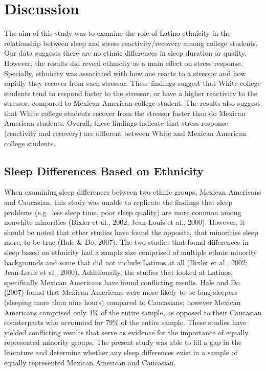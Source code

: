 \documentclass[man, fleqn, noextraspace]{apa6}
\begin{document}
\hypertarget{discussion}{%
\section{Discussion}\label{discussion}}

The aim of this study was to examine the role of Latino ethnicity in the relationship between sleep and stress reactivity/recovery among college students. Our data suggests there are no ethnic differences in sleep duration or quality. However, the results did reveal ethnicity as a main effect on stress response. Specially, ethnicity was associated with how one reacts to a stressor and how rapidly they recover from such stressor. These findings suggest that White college students tend to respond faster to the stressor, or have a higher reactivity to the stressor, compared to Mexican American college student. The results also suggest that White college students recover from the stressor faster than do Mexican American students. Overall, these findings indicate that stress response (reactivity and recovery) are different between White and Mexican American college students.

\hypertarget{sleep-differences-based-on-ethnicity}{%
\subsection{Sleep Differences Based on Ethnicity}\label{sleep-differences-based-on-ethnicity}}

When examining sleep differences between two ethnic groups, Mexican Americans and Caucasian, this study was unable to replicate the findings that sleep problems (e.g.~less sleep time, poor sleep quality) are more common among nonwhite minorities (Bixler et al., 2002; Jean-Louis et al., 2000). However, it should be noted that other studies have found the opposite, that minorities sleep more, to be true (Hale \& Do, 2007). The two studies that found differences in sleep based on ethnicity had a sample size comprised of multiple ethnic minority backgrounds and some that did not include Latinos at all (Bixler et al., 2002; Jean-Louis et al., 2000). Additionally, the studies that looked at Latinos, specifically Mexican Americans have found conflicting results. Hale and Do (2007) found that Mexican Americans were more likely to be long sleepers (sleeping more than nine hours) compared to Caucasians; however Mexican Americans comprised only 4\% of the entire sample, as opposed to their Caucasian counterparts who accounted for 79\% of the entire sample. These studies have yielded conflicting results that serve as evidence for the importance of equally represented minority groups.
The present study was able to fill a gap in the literature and determine whether any sleep differences exist in a sample of equally represented Mexican American and Caucasian.
\end{document}
